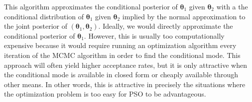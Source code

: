 \documentclass[12pt]{article}
\begin{document}
\noindent This algorithm approximates the conditional posterior of $\bm{\theta}_1$ given $\bm{\theta}_2$ with a the conditional distribution of $\bm{\theta}_1$ given $\bm{\theta}_2$ implied by the normal approximation to the joint posterior of $(\bm{\theta}_1, \bm{\theta}_2)$. Ideally, we would directly approximate the conditional posterior of $\bm{\theta}_1$. However, this is usually too computationally expensive because it would require running an optimization algorithm every iteration of the MCMC algorithm in order to find the conditional mode. This approach will often yield higher acceptance rates, but it is only attractive when the conditional mode is available in closed form or cheaply available through other means. In other words, this is attractive in precisely the situations where the optimization problem is too easy for PSO to be advantageous. 
\end{document}
